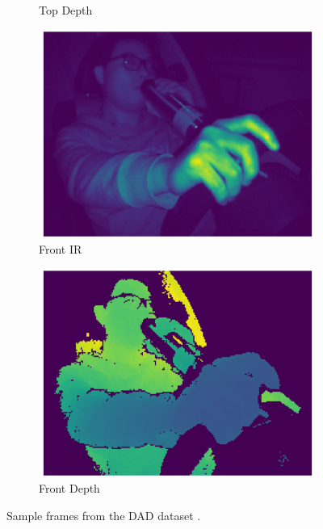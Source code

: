 \begin{frame}
\begin{figure}
\begin{subfigure}[b]{0.24\textwidth}
        \caption{Top Depth}
        \label{fig:2.b}
    \end{subfigure}
    \hfill
    \begin{subfigure}[b]{0.24\textwidth}
        \centering
        \includegraphics[width=\textwidth]{images/dad_front_ir.png}
        \caption{Front IR}
        \label{fig:2.c}
    \end{subfigure}
    \hfill
    \begin{subfigure}[b]{0.24\textwidth}
        \centering
        \includegraphics[width=\textwidth]{images/dad_front_depth.png}
        \caption{Front Depth}
        \label{fig:2.d}
    \end{subfigure}
    \caption{Sample frames from the DAD dataset \cite{kopuklu2021driver}.}
    \label{fig:2}
\end{figure}

\end{frame}

